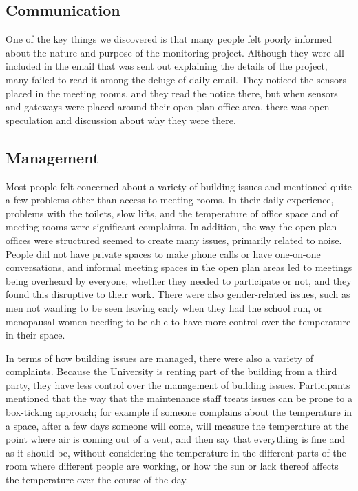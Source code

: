 \subsection{Communication}
\label{sec:communication}

One of the key things we discovered is that many people felt poorly
informed about the nature and purpose of the monitoring
project. Although they were all included in the email that was sent
out explaining the details of the project, many failed to read it
among the deluge of daily email. They noticed the sensors placed in
the meeting rooms, and they read the notice there, but when sensors
and gateways were placed around their open plan office area, there was
open speculation and discussion about why they were there. 

\subsection{Management}
\label{sec:management}

Most people felt concerned about a variety of building issues and
mentioned quite a few problems other than access to meeting rooms. In
their daily experience, problems with the toilets, slow lifts, and the
temperature of office space and of meeting rooms were significant
complaints. In addition, the way the open plan offices were structured
seemed to create many issues, primarily related to noise. People did
not have private spaces to make phone calls or have one-on-one
conversations, and informal meeting spaces in the open plan areas led
to meetings being overheard by everyone, whether they needed to
participate or not, and they found this disruptive to their
work. There were also gender-related issues, such as men not wanting
to be seen leaving early when they had the school run, or menopausal
women needing to be able to have more control over the temperature in
their space.  

In terms of how building issues are managed, there were also a variety
of complaints. Because the University is renting part of the building
from a third party, they have less control over the management of
building issues. Participants mentioned that the way that the
maintenance staff treats issues can be prone to a box-ticking
approach; for example if someone complains about the temperature in a
space, after a few days someone will come, will measure the
temperature at the point where air is coming out of a vent, and then
say that everything is fine and as it should be, without considering
the temperature in the different parts of the room where different
people are working, or how the sun or lack thereof affects the
temperature over the course of the day.


